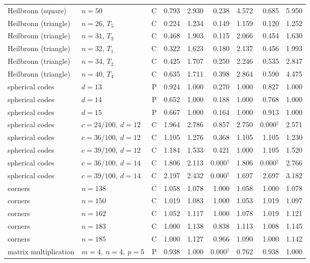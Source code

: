 \begin{longtable}{@{}P{.21\linewidth}P{.21\linewidth}rrrrrrr@{}}
Heilbronn (square) & $n=50$ & C & 0.793 & 2.930 & 0.238 & 4.572 & 0.685 & 5.950 \\
Heilbronn (triangle) & $n=26$, $T_{5}$ & C & 0.224 & 1.234 & 0.149 & 1.159 & 0.120 & 1.252 \\
Heilbronn (triangle) & $n=31$, $T_{3}$ & C & 0.468 & 1.903 & 0.115 & 2.066 & 0.454 & 1.630 \\
Heilbronn (triangle) & $n=32$, $T_{1}$ & C & 0.322 & 1.623 & 0.180 & 2.137 & 0.456 & 1.993 \\
Heilbronn (triangle) & $n=34$, $T_{2}$ & C & 0.425 & 1.707 & 0.250 & 2.246 & 0.535 & 2.847 \\
Heilbronn (triangle) & $n=40$, $T_{4}$ & C & 0.635 & 1.711 & 0.398 & 2.864 & 0.590 & 4.475 \\
\addlinespace[2pt]
spherical codes & $d=13$ & P & 0.924 & 1.000 & 0.270 & 1.000 & 0.827 & 1.000 \\
spherical codes & $d=14$ & P & 0.652 & 1.000 & 0.188 & 1.000 & 0.768 & 1.000 \\
spherical codes & $d=15$ & P & 0.667 & 1.000 & 0.164 & 1.000 & 0.913 & 1.000 \\
spherical codes & $c=24/100,\ d=12$ & C & 1.964 & 2.786 & 0.857 & 2.750 & 0.000$^{\dagger}$ & 2.571 \\
spherical codes & $c=36/100,\ d=12$ & C & 1.105 & 1.276 & 0.368 & 1.105 & 1.105 & 1.230 \\
spherical codes & $c=39/100,\ d=12$ & C & 1.184 & 1.533 & 0.421 & 1.000 & 1.105 & 1.520 \\
spherical codes & $c=36/100,\ d=14$ & C & 1.806 & 2.113 & 0.000$^{\dagger}$ & 1.806 & 0.000$^{\dagger}$ & 2.766 \\
spherical codes & $c=39/100,\ d=14$ & C & 2.197 & 2.432 & 0.000$^{\dagger}$ & 1.697 & 2.697 & 3.182 \\
\addlinespace[2pt]
corners & $n=138$ & C & 1.058 & 1.078 & 1.000 & 1.058 & 1.000 & 1.078 \\
corners & $n=150$ & C & 1.019 & 1.083 & 1.000 & 1.053 & 1.019 & 1.097 \\
corners & $n=162$ & C & 1.052 & 1.117 & 1.000 & 1.078 & 1.019 & 1.121 \\
corners & $n=183$ & C & 1.000 & 1.138 & 0.838 & 1.113 & 1.008 & 1.145 \\
corners & $n=185$ & C & 1.000 & 1.127 & 0.966 & 1.090 & 1.000 & 1.142 \\
\addlinespace[2pt]
matrix multiplication & $m=4,\ n=4,\ p=5$ & P & 0.938 & 1.000 & 0.000$^{\dagger}$ & 0.762 & 0.938 & 1.000 \\

\end{longtable}
